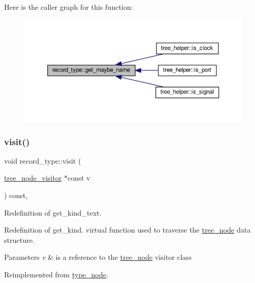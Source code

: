 Here is the caller graph for this function\+:
\nopagebreak
\begin{figure}[H]
\begin{center}
\leavevmode
\includegraphics[width=350pt]{d9/d8f/structrecord__type_abcdb0f23b59997c989a65668950b8d5c_icgraph}
\end{center}
\end{figure}
\mbox{\label{structrecord__type_a4ae646f9bc555d547c8b04a89de4135a}} 
\subsubsection{\texorpdfstring{visit()}{visit()}}
{\footnotesize\ttfamily void record\+\_\+type\+::visit (\begin{DoxyParamCaption}\item[{\hyperlink{classtree__node__visitor}{tree\+\_\+node\+\_\+visitor} $\ast$const}]{v }\end{DoxyParamCaption}) const\hspace{0.3cm}{\ttfamily [override]}, {\ttfamily [virtual]}}



Redefinition of get\+\_\+kind\+\_\+text. 

Redefinition of get\+\_\+kind. virtual function used to traverse the \hyperlink{classtree__node}{tree\+\_\+node} data structure. 
\begin{DoxyParams}{Parameters}
{\em v} & is a reference to the \hyperlink{classtree__node}{tree\+\_\+node} visitor class \\
\hline
\end{DoxyParams}


Reimplemented from \hyperlink{structtype__node_adc6e447af5f9505e6305320933c46a96}{type\+\_\+node}.




